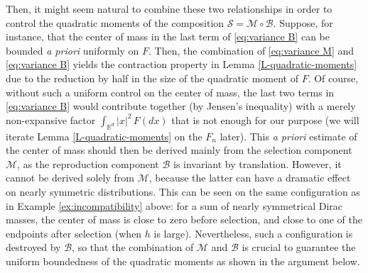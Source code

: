 \documentclass[reqno]{amsart}
\numberwithin{equation}{section}
\begin{document}
{Then, it might seem natural to combine these two relationships in order to control the quadratic moments of the composition $\mathcal{S}=\mathcal{M}\circ \mathcal{B}$. Suppose, for instance, that the center of mass in the last term of \eqref{eq:variance B} can be bounded {\em a priori} uniformly on $F$. Then, the combination of \eqref{eq:variance M} and \eqref{eq:variance B} yields the contraction property in Lemma \ref{L-quadratic-moments} due to the reduction by half in the size of the quadratic moment of $F$. Of course, without such a uniform control on the center of mass, the last two terms in \eqref{eq:variance B} would contribute together (by Jensen's inequality) with a merely non-expansive factor $\int_{\mathbb{R}^d}\vert x\vert^2\, F(dx)$ that is not enough for our purpose (we will iterate Lemma \ref{L-quadratic-moments} on the $F_n$ later). This {\em a priori} estimate of the center of mass should then be derived mainly from the selection component $\mathcal M$, as the reproduction component $\mathcal B$ is invariant by translation. However, it cannot be derived solely from $\mathcal{M}$, because the latter can have a dramatic effect on nearly symmetric distributions. This can be seen on the same configuration as in Example \ref{ex:incompatibility} above: for a sum of nearly symmetrical Dirac masses, the center of mass is close to zero before selection, and close to one of the endpoints after selection (when $h$ is large). Nevertheless, such a configuration is destroyed by $\mathcal{B}$, so that the combination of $\mathcal M$ and $\mathcal B$ is crucial to guarantee the uniform boundedness of the quadratic moments as shown in the argument below.         


}
\end{document}
